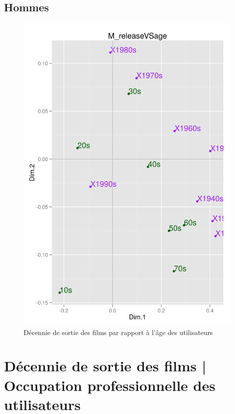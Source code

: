 \documentclass[11pt]{article}
\begin{document}
\subsection{Hommes}
\begin{figure}[htd]
\centering
\includegraphics[scale=0.65]{./images/M_releaseVSage}
\caption{Décennie de sortie des films par rapport à l'âge des utilisateurs}
\end{figure}

\pagebreak
\section{Décennie de sortie des films | Occupation professionnelle des utilisateurs}
\end{document}

